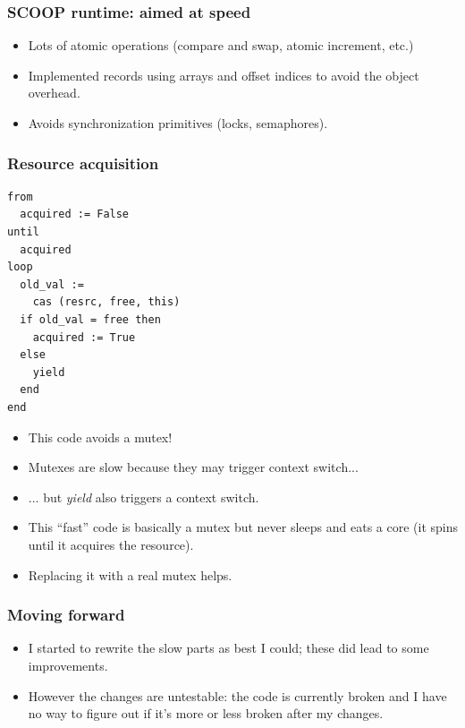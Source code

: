 \documentclass{beamer}
\begin{document}
\begin{frame}
  \frametitle{SCOOP runtime: aimed at speed}
  
  \begin{itemize}
  \item Lots of atomic operations (compare and swap, atomic increment, etc.)
  \item Implemented records using arrays and offset indices to 
    avoid the object overhead.
  \item Avoids synchronization primitives (locks, semaphores).
  \end{itemize}  
\end{frame}

\begin{frame}[fragile]
  \frametitle{Resource acquisition}
  
  \begin{minipage}[c]{0.45\linewidth}
  \begin{lstlisting}
from
  acquired := False
until 
  acquired
loop
  old_val :=
    cas (resrc, free, this)
  if old_val = free then
    acquired := True
  else
    yield
  end
end
  \end{lstlisting}
\end{minipage}
\begin{minipage}[c]{0.45\linewidth}
  \begin{itemize}[<+->]
  \item This code avoids a mutex!
  \item Mutexes are slow because they may trigger context switch...
  \item ... but \emph{yield} also triggers a context switch.
  \item This ``fast'' code is basically a mutex but never sleeps and
    eats a core (it spins until it acquires the resource).
  \item Replacing it with a real mutex helps.
  \end{itemize}
\end{minipage}
\end{frame}

\begin{frame}
  \frametitle{Moving forward}

  \begin{itemize}[<+->]
  \item I started to rewrite the slow parts as best I could;
    these did lead to some improvements.
  \item However the changes are untestable: the code is currently
    broken and I have no way to figure out if it's more or less broken 
    after my changes.
  \end{itemize}
\end{frame}
\end{document}
